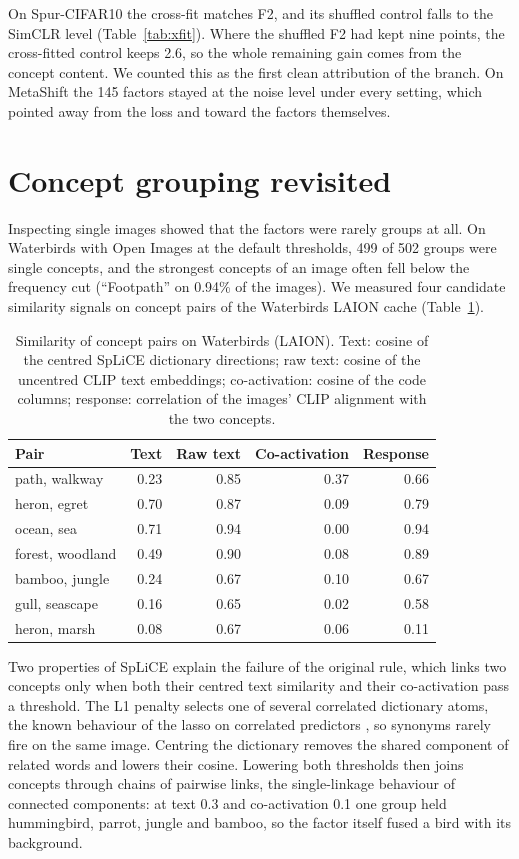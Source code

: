 \documentclass{article}
\begin{document}
On Spur-CIFAR10 the cross-fit matches F2, and its shuffled control falls to the SimCLR level
(Table~\ref{tab:xfit}). Where the shuffled F2 had kept nine points, the cross-fitted control keeps
2.6, so the whole remaining gain comes from the concept content. We counted this as the first clean
attribution of the branch. On MetaShift the 145 factors stayed at the noise level under every setting,
which pointed away from the loss and toward the factors themselves.

\section{Concept grouping revisited}
\label{sec:grouping}

Inspecting single images showed that the factors were rarely groups at all. On Waterbirds with Open
Images at the default thresholds, 499 of 502 groups were single concepts, and the strongest concepts of
an image often fell below the frequency cut (``Footpath'' on 0.94\% of the images). We measured four
candidate similarity signals on concept pairs of the Waterbirds LAION cache (Table~\ref{tab:signals}).

\begin{table}[h]
\centering
\caption{Similarity of concept pairs on Waterbirds (LAION). Text: cosine of the centred SpLiCE
dictionary directions; raw text: cosine of the uncentred CLIP text embeddings; co-activation: cosine
of the code columns; response: correlation of the images' CLIP alignment with the two concepts.}
\label{tab:signals}
\small
\begin{tabular}{l r r r r}
\toprule
Pair & Text & Raw text & Co-activation & Response \\
\midrule
path, walkway & 0.23 & 0.85 & 0.37 & 0.66 \\
heron, egret & 0.70 & 0.87 & 0.09 & 0.79 \\
ocean, sea & 0.71 & 0.94 & 0.00 & 0.94 \\
forest, woodland & 0.49 & 0.90 & 0.08 & 0.89 \\
\midrule
bamboo, jungle & 0.24 & 0.67 & 0.10 & 0.67 \\
gull, seascape & 0.16 & 0.65 & 0.02 & 0.58 \\
heron, marsh & 0.08 & 0.67 & 0.06 & 0.11 \\
\bottomrule
\end{tabular}
\end{table}

Two properties of SpLiCE explain the failure of the original rule, which links two concepts only when
both their centred text similarity and their co-activation pass a threshold. The L1 penalty selects one
of several correlated dictionary atoms, the known behaviour of the lasso on correlated predictors
\citep{tibshirani1996lasso,zou2005elasticnet}, so synonyms rarely fire on the same image. Centring the
dictionary removes the shared component of related words and lowers their cosine. Lowering both
thresholds then joins concepts through chains of pairwise links, the single-linkage behaviour of
connected components: at text 0.3 and co-activation 0.1 one group held hummingbird, parrot, jungle and
bamboo, so the factor itself fused a bird with its background.
\end{document}
